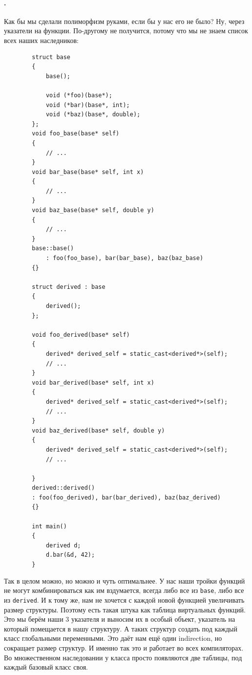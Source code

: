 \documentclass{article}
\begin{document}
    \paragraph{.}
    Как бы мы сделали полиморфизм руками, если бы у нас его не было? Ну, через указатели на функции. По-другому не получится, потому что мы не знаем список всех наших наследников:
    \begin{verbatim}
        struct base
        {
            base();
            
            void (*foo)(base*);
            void (*bar)(base*, int);
            void (*baz)(base*, double);
        };
        void foo_base(base* self)
        {
            // ...
        }
        void bar_base(base* self, int x)
        {
            // ...
        }
        void baz_base(base* self, double y)
        {
            // ...
        }
        base::base()
            : foo(foo_base), bar(bar_base), baz(baz_base)
        {}

        struct derived : base
        {
            derived();
        };
        
        void foo_derived(base* self)
        {
            derived* derived_self = static_cast<derived*>(self);
            // ...
        }
        void bar_derived(base* self, int x)
        {
            derived* derived_self = static_cast<derived*>(self);
            // ...
        }
        void baz_derived(base* self, double y)
        {
            derived* derived_self = static_cast<derived*>(self);
            // ...
            
        }
        derived::derived()
        : foo(foo_derived), bar(bar_derived), baz(baz_derived)
        {}

        int main()
        {
            derived d;
            d.bar(&d, 42);
        }
    \end{verbatim}
    Так в целом можно, но можно и чуть оптимальнее. У нас наши тройки функций не могут комбинироваться как им вздумается, всегда либо все из \texttt{base}, либо все из \texttt{derived}. И к тому же, нам не хочется с каждой новой функцией увеличивать размер структуры. Поэтому есть такая штука как таблица виртуальных функций. Это мы берём наши 3 указателя и выносим их в особый объект, указатель на который помещается в нашу структуру. А таких структур создать под каждый класс глобальными переменными. Это даёт нам ещё один indirection, но сокращает размер структур. И именно так это и работает во всех компиляторах. Во множественном наследовании у класса просто появляются две таблицы, под каждый базовый класс своя.
\end{document}

